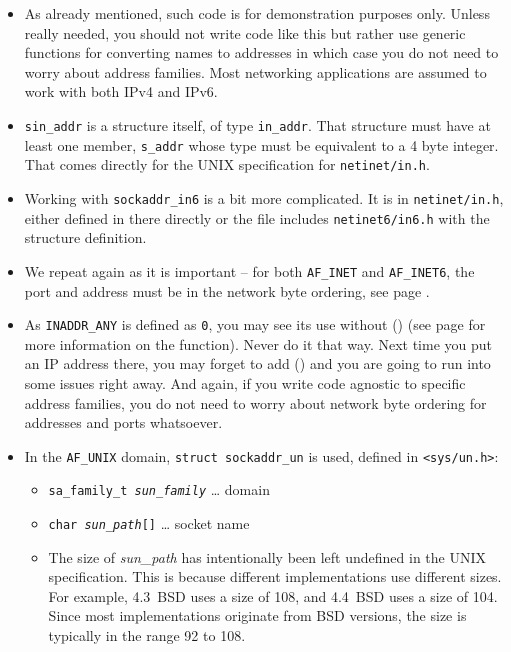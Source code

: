 \begin{itemize}
\item As already mentioned, such code is for demonstration purposes only.
Unless really needed, you should not write code like this but rather use generic
functions for converting names to addresses in which case you do not need to
worry about address families.  Most networking applications are assumed to work
with both IPv4 and IPv6.
\item \texttt{sin\_addr} is a structure itself, of type \texttt{in\_addr}.  That
structure must have at least one member, \texttt{s\_addr} whose type must be
equivalent to a 4 byte integer.  That comes directly for the UNIX specification
for \texttt{netinet/in.h}.
\item Working with \texttt{sockaddr\_in6} is a bit more complicated.  It is in
\texttt{netinet/in.h}, either defined in there directly or the file includes
\texttt{netinet6/in6.h} with the structure definition.
\item We repeat again as it is important -- for both \texttt{AF\_INET} and
\texttt{AF\_INET6}, the port and address must be in the network byte ordering,
see page \pageref{HTON}.
\item As \texttt{INADDR\_ANY} is defined as \texttt{0}, you may see its use
without () (see page \pageref{HTON} for more information on the
function).  Never do it that way.  Next time you put an IP address there, you
may forget to add () and you are going to run into some issues
right away.  And again, if you write code agnostic to specific address families,
you do not need to worry about network byte ordering for addresses and ports
whatsoever.
\item In the \texttt{AF\_UNIX} domain, \texttt{struct
sockaddr\_un} is used, defined in \texttt{<sys/un.h>}:
\begin{itemize}
\item \texttt{sa\_family\_t \emph{sun\_family}} \dots{} domain
\item \texttt{char \emph{sun\_path}[]} \dots{} socket name
\item The size of \emph{sun\_path} has intentionally been left undefined in the
UNIX specification. This is because different implementations use different
sizes.  For example, 4.3~BSD uses a size of 108, and 4.4~BSD uses a size of 104.
Since most implementations originate from BSD versions, the size is typically in
the range 92 to 108.
\end{itemize}
\end{itemize}

